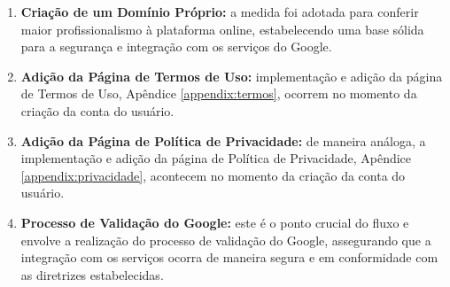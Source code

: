 \begin{enumerate}
    \item\textbf{Criação de um Domínio Próprio:} a medida foi adotada para conferir maior profissionalismo à plataforma online, estabelecendo uma base sólida para a segurança e integração com os serviços do Google.
    \item\textbf{Adição da Página de Termos de Uso:} implementação e adição da página de Termos de Uso, Apêndice \ref{appendix:termos}, ocorrem no momento da criação da conta do usuário.
    \item\textbf{Adição da Página de Política de Privacidade:} de maneira análoga, a implementação e adição da página de Política de Privacidade, Apêndice \ref{appendix:privacidade}, acontecem no momento da criação da conta do usuário.
    \item\textbf{Processo de Validação do Google:} este é o ponto crucial do fluxo e envolve a realização do processo de validação do Google, assegurando que a integração com os serviços ocorra de maneira segura e em conformidade com as diretrizes estabelecidas.
\end{enumerate}